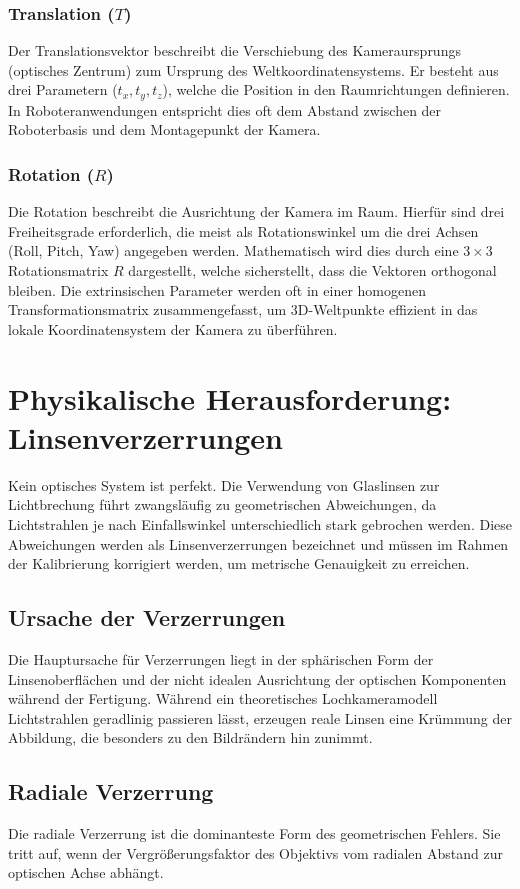\documentclass[12pt,a4paper,parskip=half]{scrartcl}
\begin{document}
\subsubsection{Translation (\texorpdfstring{$T$}{T})}
Der Translationsvektor beschreibt die Verschiebung des Kameraursprungs (optisches Zentrum) zum Ursprung des Weltkoordinatensystems. Er besteht aus drei Parametern ($t_x, t_y, t_z$), welche die Position in den Raumrichtungen definieren. In Roboteranwendungen entspricht dies oft dem Abstand zwischen der Roboterbasis und dem Montagepunkt der Kamera.

\subsubsection{Rotation (\texorpdfstring{$R$}{R})}
Die Rotation beschreibt die Ausrichtung der Kamera im Raum. Hierfür sind drei Freiheitsgrade erforderlich, die meist als Rotationswinkel um die drei Achsen (Roll, Pitch, Yaw) angegeben werden. Mathematisch wird dies durch eine $3 \times 3$ Rotationsmatrix $R$ dargestellt, welche sicherstellt, dass die Vektoren orthogonal bleiben. Die extrinsischen Parameter werden oft in einer homogenen Transformationsmatrix zusammengefasst, um 3D-Weltpunkte effizient in das lokale Koordinatensystem der Kamera zu überführen.

\section{Physikalische Herausforderung: Linsenverzerrungen}
Kein optisches System ist perfekt. Die Verwendung von Glaslinsen zur Lichtbrechung führt zwangsläufig zu geometrischen Abweichungen, da Lichtstrahlen je nach Einfallswinkel unterschiedlich stark gebrochen werden. Diese Abweichungen werden als Linsenverzerrungen bezeichnet und müssen im Rahmen der Kalibrierung korrigiert werden, um metrische Genauigkeit zu erreichen.

\subsection{Ursache der Verzerrungen}
Die Hauptursache für Verzerrungen liegt in der sphärischen Form der Linsenoberflächen und der nicht idealen Ausrichtung der optischen Komponenten während der Fertigung. Während ein theoretisches Lochkameramodell Lichtstrahlen geradlinig passieren lässt, erzeugen reale Linsen eine Krümmung der Abbildung, die besonders zu den Bildrändern hin zunimmt.

\subsection{Radiale Verzerrung}
Die radiale Verzerrung ist die dominanteste Form des geometrischen Fehlers. Sie tritt auf, wenn der Vergrößerungsfaktor des Objektivs vom radialen Abstand zur optischen Achse abhängt.
\end{document}
